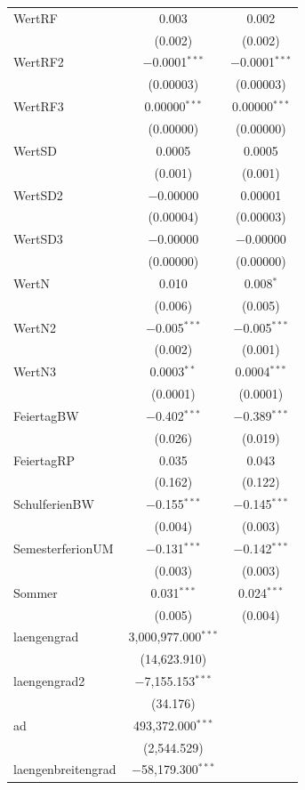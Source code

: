 \documentclass[a4paper,12pt]{thesis}
\begin{document}
\begin{longtable}{@{\extracolsep{-5pt}}lcc}
		WertRF & 0.003 & 0.002 \\ 
		& (0.002) & (0.002) \\ 
		WertRF2 & $-$0.0001$^{***}$ & $-$0.0001$^{***}$ \\ 
		& (0.00003) & (0.00003) \\ 
		WertRF3 & 0.00000$^{***}$ & 0.00000$^{***}$ \\ 
		& (0.00000) & (0.00000) \\ 
		WertSD & 0.0005 & 0.0005 \\ 
		& (0.001) & (0.001) \\ 
		WertSD2 & $-$0.00000 & 0.00001 \\ 
		& (0.00004) & (0.00003) \\ 
		WertSD3 & $-$0.00000 & $-$0.00000 \\ 
		& (0.00000) & (0.00000) \\ 
		WertN & 0.010 & 0.008$^{*}$ \\ 
		& (0.006) & (0.005) \\ 
		WertN2 & $-$0.005$^{***}$ & $-$0.005$^{***}$ \\ 
		& (0.002) & (0.001) \\ 
		WertN3 & 0.0003$^{**}$ & 0.0004$^{***}$ \\ 
		& (0.0001) & (0.0001) \\ 
		FeiertagBW & $-$0.402$^{***}$ & $-$0.389$^{***}$ \\ 
		& (0.026) & (0.019) \\ 
		FeiertagRP & 0.035 & 0.043 \\ 
		& (0.162) & (0.122) \\ 
		SchulferienBW & $-$0.155$^{***}$ & $-$0.145$^{***}$ \\ 
		& (0.004) & (0.003) \\ 
		SemesterferionUM & $-$0.131$^{***}$ & $-$0.142$^{***}$ \\ 
		& (0.003) & (0.003) \\ 
		Sommer & 0.031$^{***}$ & 0.024$^{***}$ \\ 
		& (0.005) & (0.004) \\ 
		laengengrad & 3,000,977.000$^{***}$ &  \\ 
		& (14,623.910) &  \\ 
		laengengrad2 & $-$7,155.153$^{***}$ &  \\ 
		& (34.176) &  \\ ad & 493,372.000$^{***}$ &  \\ 
		& (2,544.529) &  \\ 
		laengenbreitengrad & $-$58,179.300$^{***}$ &  \\ 

\end{longtable}
\end{document}
